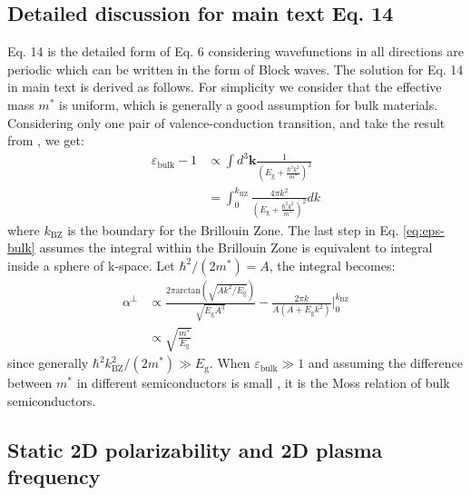 \documentclass[manuscript=suppinfo,email=true,hyperref=true,keywords=false]{achemso}
\begin{document}
\subsection{Detailed discussion for main text Eq. 14 }
\label{sec:theory-2}

Eq. 14 is the detailed form of Eq. 6 considering wavefunctions in all
directions are periodic which can be written in the form of Block
waves. The solution for Eq. 14 in main text is derived as follows. For
simplicity we consider that the effective mass $m^{*}$ is uniform,
which is generally a good assumption for bulk materials. Considering
only one pair of valence-conduction transition, and take the result
from \cite{Jiang_2017_Eg_Eb}, we get:
\begin{equation}
  \begin{aligned}
    \label{eq:eps-bulk}
    \varepsilon_{\mathrm{bulk}} - 1 &\propto \int d^{3}\mathbf{k}
    {\displaystyle \frac{1}{(E_{\mathrm{g}} + {\displaystyle
          \frac{\hbar^{2} k^{2}}{m^{*}}})^{2}}}\\
    &= \int_{0}^{k_{\mathrm{BZ}}} {\displaystyle
      \frac{4 \pi k^{2}}{(E_{\mathrm{g}} + {\displaystyle \frac{\hbar^{2}
            k^{2}}{m^{*}}})^{2}}} dk
  \end{aligned}
\end{equation}
where $k_{\mathrm{BZ}}$ is the boundary for the Brillouin Zone. The
last step in Eq. \ref{eq:eps-bulk} assumes the integral within the
Brillouin Zone is equivalent to integral inside a sphere of
k-space. Let $\hbar^{2}/(2 m^{*})=A$, the integral becomes:
\begin{equation}
  \begin{aligned}
    \label{eq:integral-BZ-bulk}
    \alpha^{\perp} &\propto {\displaystyle \frac{2 \pi
        \mathrm{arctan}(\sqrt{Ak^{2}/E_{\mathrm{g}}})}{\sqrt{E_{\mathrm{g}}A^{3}}}
        - \frac{2\pi k}{A(A+E_{\mathrm{g}}k^{2})}
      } \bigg\rvert_{0}^{k_{\mathrm{BZ}}}\\
      &\propto \sqrt{\frac{m^{*}}{E_{\mathrm{g}}}}
  \end{aligned}
\end{equation}
since generally
$\hbar^{2}k_{\mathrm{BZ}}^{2}/(2m^{*}) \gg E_{\mathrm{g}}$. When
$\varepsilon_{\mathrm{bulk}} \gg 1$ and assuming the difference
between $m^{*}$ in different semiconductors is small
\cite{Finkenrath_1988}, it is the Moss relation of bulk semiconductors.

\subsection{Static 2D polarizability and 2D plasma frequency}
\label{sec:omega-p}
\end{document}
